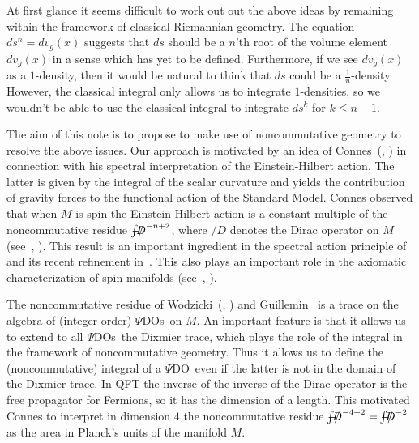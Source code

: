 \documentclass[leqno, 10pt]{amsart}
\theoremstyle{remark}
\begin{document}
At first glance it seems difficult to work out out the above ideas by remaining within the framework of classical Riemannian geometry. 
The equation $ds^{n}=dv_{g}(x)$ suggests that 
$ds$ should be a $n$'th root of the volume element $dv_{g}(x)$ in a sense which has yet to be defined. Furthermore, if we see $dv_{g}(x)$ as a 
$1$-density, then it would be natural to think that $ds$ could be a $\frac{1}{n}$-density. However, the classical integral only allows us to 
integrate $1$-densities, so we wouldn't be able to use the classical integral to integrate $ds^{k}$ for $k \leq n-1$. 

The aim of this note is to propose to make use of noncommutative geometry to resolve the above issues. Our approach is motivated by 
an idea of Connes~(\cite{Co:GCMFNCG}, \cite{CC:SAP}) in connection with his spectral 
interpretation of the Einstein-Hilbert action. The latter is given by the integral of the scalar curvature and yields 
the contribution of gravity forces to the functional action of the Standard Model. Connes observed that when $M$ is spin the Einstein-Hilbert action is a 
constant multiple of the noncommutative residue ${\ensuremath{-\hspace{-2,4ex}\int}} {\ensuremath{{/\!\!\!\!D}}}^{-n+2}$, where ${\ensuremath{{/\!\!\!\!D}}}$ denotes the Dirac operator on $M$ (see~\cite{KW:GNGWR}, \cite{Ka:DOG}). 
This result is an important ingredient in 
the spectral action principle of~\cite{CC:SAP} and its recent refinement in~\cite{CC:GSMNM}. This also plays an important role in the axiomatic 
characterization of spin manifolds (see~\cite{Co:GCMFNCG}, \cite{RV:RMBCG}). 

The noncommutative residue of Wodzicki~(\cite{Wo:LISA}, \cite{Wo:NCRF}) and Guillemin~\cite{Gu:NPWF} is a trace on the algebra of 
(integer order) {$\Psi$DOs}\ on $M$. An important feature is that 
it allows us to extend to all {$\Psi$DOs}\ the Dixmier trace, which plays the role of the integral in the framework of noncommutative geometry. Thus it 
allows us to define the (noncommutative) integral of a {$\Psi$DO}\ even if the latter is not in the domain of the Dixmier trace. In QFT the inverse of the inverse of the 
Dirac operator 
is the free propagator for Fermions, so it has the dimension of a length. This motivated Connes to interpret in dimension $4$ the noncommutative residue 
${\ensuremath{-\hspace{-2,4ex}\int}} {\ensuremath{{/\!\!\!\!D}}}^{-4+2}={\ensuremath{-\hspace{-2,4ex}\int}} {\ensuremath{{/\!\!\!\!D}}}^{-2}$ as the area in Planck's units of the manifold $M$. 
\end{document}
